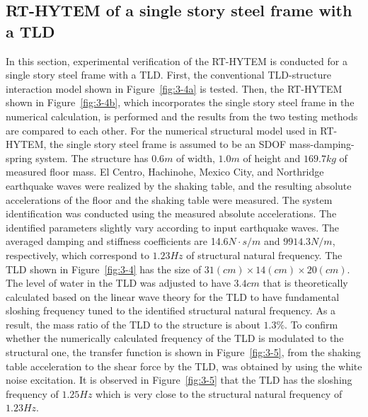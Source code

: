 \clearpage
\subsection{RT-HYTEM of a single story steel frame with a TLD}
In this section, experimental verification of the RT-HYTEM is conducted for a single story steel frame with a TLD. First, the conventional TLD-structure interaction model shown in Figure~\ref{fig:3-4a} is tested. Then, the RT-HYTEM shown in Figure~\ref{fig:3-4b}, which incorporates the single story steel frame in the numerical calculation, is performed and the results from the two testing methods are compared to each other.
For the numerical structural model used in RT-HYTEM, the single story steel frame is assumed to be an SDOF mass-damping-spring system. The structure has $0.6m$ of width, $1.0m$ of height and $169.7kg$ of measured floor mass. El Centro, Hachinohe, Mexico City, and Northridge earthquake waves were realized by the shaking table, and the resulting absolute accelerations of the floor and the shaking table were measured. The system identification was conducted using the measured absolute accelerations. The identified parameters slightly vary according to input earthquake waves. The averaged damping and stiffness coefficients are 14.6$N\cdot s/m$ and $9914.3N/m$, respectively, which correspond to $1.23Hz$ of structural natural frequency. The TLD shown in Figure~\ref{fig:3-4} has the size of $31(cm)\times14(cm)\times20(cm)$. The level of water in the TLD was adjusted to have $3.4cm$ that is theoretically calculated based on the linear wave theory\citep{soong1997passive} for the TLD to have fundamental sloshing frequency tuned to the identified structural natural frequency. As a result, the mass ratio of the TLD to the structure is about $1.3\%$. To confirm whether the numerically calculated frequency of the TLD is modulated to the structural one, the transfer function is shown in Figure~\ref{fig:3-5}, from the shaking table acceleration to the shear force by the TLD, was obtained by using the white noise excitation. It is observed in Figure~\ref{fig:3-5} that the TLD has the sloshing frequency of $1.25Hz$ which is very close to the structural natural frequency of $1.23Hz$.

